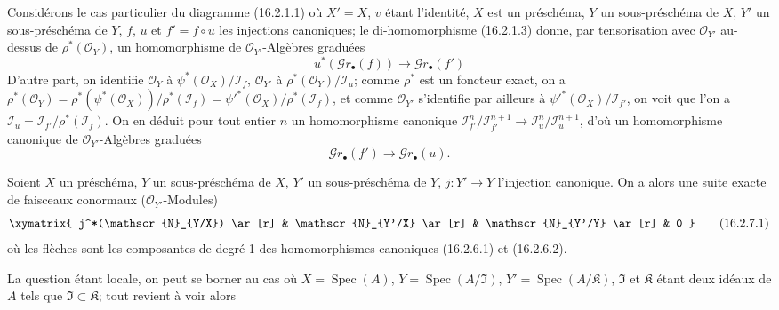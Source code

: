 \begin{env}[16.2.6]
\label{IV.16.2.6}
Considérons le cas particulier du diagramme (16.2.1.1) où $X'=X$, $v$ étant
l'identité, $X$ est un préschéma, $Y$ un sous-préschéma de $X$, $Y'$ un
sous-préschéma de $Y$, $f$, $u$ et $f'=f\circ u$ les injections canoniques; le
di-homomorphisme (16.2.1.3) donne, par tensorisation avec
$\mathcal{O}_{Y'}$ au-dessus de $\rho^*(\mathcal{O}_Y)$, un homomorphisme de
$\mathcal{O}_{Y'}$-Algèbres graduées
\[
  u^*(\mathscr{G}r_\bullet(f))
  \longrightarrow\mathscr{G}r_\bullet(f')
  \tag{16.2.6.1}
  \label{IV.16.2.6.1}
\]
D'autre part, on identifie $\mathcal{O}_Y$ à
$\psi^*(\mathcal{O}_X)/\mathscr{I}_f$, $\mathcal{O}_{Y'}$ à
$\rho^*(\mathcal{O}_Y)/\mathscr{I}_u$; comme $\rho^*$ est un foncteur exact,
on a
$\rho^*(\mathcal{O}_Y)=
\rho^*(\psi^*(\mathcal{O}_X))/\rho^*(\mathscr{I}_f)=
\psi'^*(\mathcal{O}_X)/\rho^*(\mathscr{I}_f)$, et comme
$\mathcal{O}_{Y'}$ s'identifie par ailleurs à
$\psi'^*(\mathcal{O}_X)/\mathscr{I}_{f'}$, on voit que l'on a
$\mathscr{I}_u=\mathscr{I}_{f'}/\rho^*(\mathscr{I}_f)$. On en déduit pour
tout entier $n$ un homomorphisme canonique
$\mathscr{I}_{f'}^n/\mathscr{I}_{f'}^{n+1}\to
\mathscr{I}_u^n/\mathscr{I}_u^{n+1}$, d'où un homomorphisme canonique de
$\mathcal{O}_{Y'}$-Algèbres graduées
\[
  \mathscr{G}r_\bullet(f')
  \longrightarrow\mathscr{G}r_\bullet(u).
  \tag{16.2.6.2}
  \label{IV.16.2.6.2}
\]
\end{env}

\begin{proposition}[16.2.7]
\label{IV.16.2.7}
Soient $X$ un préschéma, $Y$ un sous-préschéma de $X$, $Y'$ un
sous-préschéma de $Y$, $j:Y'\to Y$ l'injection canonique. On a alors une suite
exacte de faisceaux conormaux ($\mathcal{O}_{Y'}$-Modules)
\[
  \xymatrix{
    j^*(\mathscr{N}_{Y/X}) \ar[r] &
    \mathscr{N}_{Y'/X} \ar[r] &
    \mathscr{N}_{Y'/Y} \ar[r] & 0
  }
  \tag{16.2.7.1}
  \label{IV.16.2.7.1}
\]
où les flèches sont les composantes de degré 1 des homomorphismes canoniques
(16.2.6.1) et (16.2.6.2).
\end{proposition}

La question étant locale, on peut se borner au cas où
$X=\operatorname{Spec}(A)$, $Y=\operatorname{Spec}(A/\mathfrak{I})$,
$Y'=\operatorname{Spec}(A/\mathfrak{K})$, $\mathfrak{I}$ et $\mathfrak{K}$
étant deux idéaux de $A$ tels que $\mathfrak{I}\subset\mathfrak{K}$; tout
revient à voir alors
